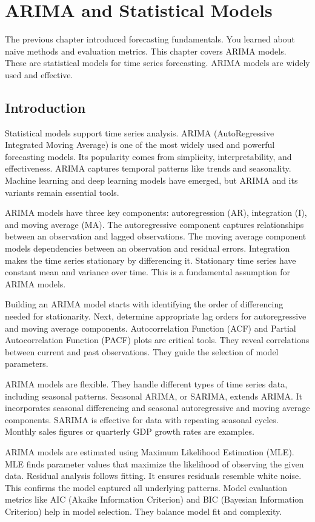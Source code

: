 \chapter{ARIMA and Statistical Models}

The previous chapter introduced forecasting fundamentals. You learned about naive methods and evaluation metrics. This chapter covers ARIMA models. These are statistical models for time series forecasting. ARIMA models are widely used and effective.

\section{Introduction}

Statistical models support time series analysis. ARIMA (AutoRegressive Integrated Moving Average) is one of the most widely used and powerful forecasting models. Its popularity comes from simplicity, interpretability, and effectiveness. ARIMA captures temporal patterns like trends and seasonality. Machine learning and deep learning models have emerged, but ARIMA and its variants remain essential tools.

ARIMA models have three key components: autoregression (AR), integration (I), and moving average (MA). The autoregressive component captures relationships between an observation and lagged observations. The moving average component models dependencies between an observation and residual errors. Integration makes the time series stationary by differencing it. Stationary time series have constant mean and variance over time. This is a fundamental assumption for ARIMA models.

Building an ARIMA model starts with identifying the order of differencing needed for stationarity. Next, determine appropriate lag orders for autoregressive and moving average components. Autocorrelation Function (ACF) and Partial Autocorrelation Function (PACF) plots are critical tools. They reveal correlations between current and past observations. They guide the selection of model parameters.

ARIMA models are flexible. They handle different types of time series data, including seasonal patterns. Seasonal ARIMA, or SARIMA, extends ARIMA. It incorporates seasonal differencing and seasonal autoregressive and moving average components. SARIMA is effective for data with repeating seasonal cycles. Monthly sales figures or quarterly GDP growth rates are examples.

ARIMA models are estimated using Maximum Likelihood Estimation (MLE). MLE finds parameter values that maximize the likelihood of observing the given data. Residual analysis follows fitting. It ensures residuals resemble white noise. This confirms the model captured all underlying patterns. Model evaluation metrics like AIC (Akaike Information Criterion) and BIC (Bayesian Information Criterion) help in model selection. They balance model fit and complexity.

